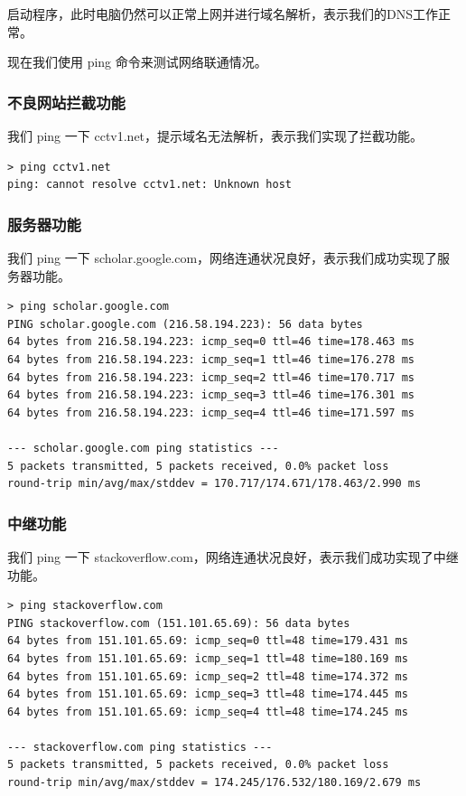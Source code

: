 \documentclass[]{article}
\begin{document}
        启动程序，此时电脑仍然可以正常上网并进行域名解析，表示我们的DNS工作正常。

        现在我们使用 ping 命令来测试网络联通情况。

        \subsubsection{不良网站拦截功能}
            我们 ping 一下 cctv1.net，提示域名无法解析，表示我们实现了拦截功能。

            \begin{lstlisting}
> ping cctv1.net                
ping: cannot resolve cctv1.net: Unknown host
            \end{lstlisting}

        \subsubsection{服务器功能}
            我们 ping 一下 scholar.google.com，网络连通状况良好，表示我们成功实现了服务器功能。

            \begin{lstlisting}
> ping scholar.google.com
PING scholar.google.com (216.58.194.223): 56 data bytes
64 bytes from 216.58.194.223: icmp_seq=0 ttl=46 time=178.463 ms
64 bytes from 216.58.194.223: icmp_seq=1 ttl=46 time=176.278 ms
64 bytes from 216.58.194.223: icmp_seq=2 ttl=46 time=170.717 ms
64 bytes from 216.58.194.223: icmp_seq=3 ttl=46 time=176.301 ms
64 bytes from 216.58.194.223: icmp_seq=4 ttl=46 time=171.597 ms

--- scholar.google.com ping statistics ---
5 packets transmitted, 5 packets received, 0.0% packet loss
round-trip min/avg/max/stddev = 170.717/174.671/178.463/2.990 ms
            \end{lstlisting}

        \subsubsection{中继功能}
            我们 ping 一下 stackoverflow.com，网络连通状况良好，表示我们成功实现了中继功能。

            \begin{lstlisting}
> ping stackoverflow.com
PING stackoverflow.com (151.101.65.69): 56 data bytes
64 bytes from 151.101.65.69: icmp_seq=0 ttl=48 time=179.431 ms
64 bytes from 151.101.65.69: icmp_seq=1 ttl=48 time=180.169 ms
64 bytes from 151.101.65.69: icmp_seq=2 ttl=48 time=174.372 ms
64 bytes from 151.101.65.69: icmp_seq=3 ttl=48 time=174.445 ms
64 bytes from 151.101.65.69: icmp_seq=4 ttl=48 time=174.245 ms

--- stackoverflow.com ping statistics ---
5 packets transmitted, 5 packets received, 0.0% packet loss
round-trip min/avg/max/stddev = 174.245/176.532/180.169/2.679 ms                
            \end{lstlisting}
\end{document}
